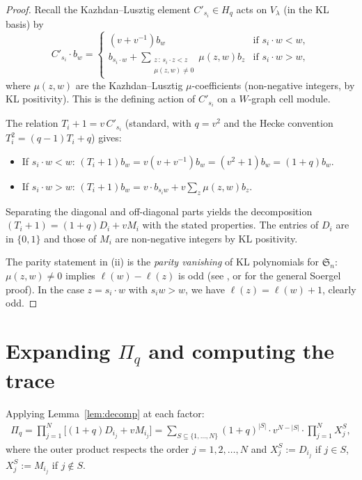 \documentclass[11pt]{article}
\theoremstyle{plain}
\theoremstyle{definition}
\theoremstyle{remark}
\newcommand{\Sym}{\mathfrak{S}}
\newcommand{\Hq}{H_q}
\newcommand{\Pibs}{\Pi_q}
\newcommand{\Vlam}{V_\lambda}
\begin{document}
\begin{proof}
Recall the Kazhdan--Lusztig element $C'_{s_i} \in \Hq$ acts on $\Vlam$ (in the KL basis) by
\begin{equation}
\label{eq:kl-action}
 C'_{s_i} \cdot b_w = \begin{cases} (v + v^{-1}) b_w & \text{if } s_i \cdot w < w, \\ b_{s_i \cdot w} + \displaystyle\sum_{\substack{z\,:\, s_i \cdot z < z \\ \mu(z, w) \neq 0}} \mu(z, w) b_z & \text{if } s_i \cdot w > w, \end{cases}
\end{equation}
where $\mu(z, w)$ are the Kazhdan--Lusztig $\mu$-coefficients (non-negative integers, by KL positivity). This is the defining action of $C'_{s_i}$ on a $W$-graph cell module.

The relation $T_i + 1 = v\, C'_{s_i}$ (standard, with $q = v^2$ and the Hecke convention $T_i^2 = (q-1)T_i + q$) gives:
\begin{itemize}
    \item If $s_i \cdot w < w$: $(T_i + 1) b_w = v(v + v^{-1}) b_w = (v^2 + 1) b_w = (1+q) b_w$.
    \item If $s_i \cdot w > w$: $(T_i + 1) b_w = v \cdot b_{s_i w} + v \sum_z \mu(z, w) b_z$.
\end{itemize}
Separating the diagonal and off-diagonal parts yields the decomposition $(T_i + 1) = (1+q) D_i + v M_i$ with the stated properties. The entries of $D_i$ are in $\{0, 1\}$ and those of $M_i$ are non-negative integers by KL positivity.

The parity statement in (ii) is the \emph{parity vanishing} of KL polynomials for $\Sym_n$: $\mu(z, w) \neq 0$ implies $\ell(w) - \ell(z)$ is odd (see \cite[\S 6]{KL}, or \cite{EW} for the general Soergel proof). In the case $z = s_i \cdot w$ with $s_i w > w$, we have $\ell(z) = \ell(w) + 1$, clearly odd. \qedhere
\end{proof}

\section{Expanding $\Pibs$ and computing the trace}

Applying Lemma~\ref{lem:decomp} at each factor:
\begin{align}
\Pibs = \prod_{j=1}^{N} \bigl[(1+q) D_{i_j} + v M_{i_j}\bigr] = \sum_{S \subseteq \{1, \ldots, N\}} (1+q)^{|S|} \cdot v^{N - |S|} \cdot \prod_{j=1}^{N} X_j^{S}, \label{eq:expand}
\end{align}
where the outer product respects the order $j = 1, 2, \ldots, N$ and $X_j^S := D_{i_j}$ if $j \in S$, $X_j^S := M_{i_j}$ if $j \notin S$.
\end{document}
